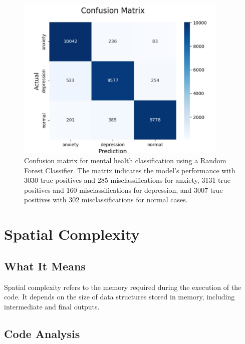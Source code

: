 \documentclass[runningheads,a4paper,11pt]{report}
\begin{document}
\begin{figure}[H]
\centering
\includegraphics[width=0.9\textwidth]{Multi-Class-Data.jpg}
\caption[Confusion matrix for mental health classification (Random Forest Classifier)]{Confusion matrix for mental health classification using a Random Forest Classifier. The matrix indicates the model's performance with 3030 true positives and 285 misclassifications for anxiety, 3131 true positives and 160 misclassifications for depression, and 3007 true positives with 302 misclassifications for normal cases.}
\label{fig:confusion_matrix_rf}
\end{figure}
\clearpage




\section{Spatial Complexity}
\label{section:spatial-complexity}

\subsection{What It Means}
\label{section:what-it-means}
Spatial complexity refers to the memory required during the execution of the code. It depends on the size of data structures stored in memory, including intermediate and final outputs.

\subsection{Code Analysis}
\label{section:code}
\end{document}

